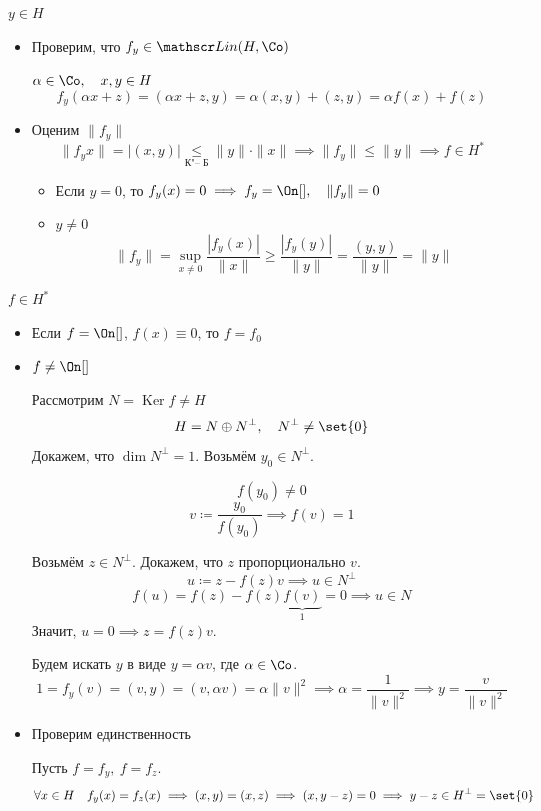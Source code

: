 \begin{eproof}
\item $ y \in H $
	\begin{itemize}
		\item Проверим, что $ f_y \in \mathscr Lin(H, \Co) $

			$ \alpha \in \Co, \quad x, y \in H $
			$$ f_y(\alpha x + z) = (\alpha x + z, y) =
			\alpha (x, y) + (z, y) = \alpha f(x) + f(z) $$
		\item Оценим $ \|f_y\| $
			$$ \|f_y x\| = |(x, y)| \underset{\text{К"--~Б}}\le \|y\| \cdot \|x\| \implies
			\|f_y\| \le \|y\| \implies f \in H^* $$

			\begin{itemize}
				\item Если $ y = 0 $, то $ f_y(x) = 0 \implies f_y = \On[], \quad \|f_y\| = 0 $
				\item $ y \ne 0 $
					$$ \|f_y\| = \sup\limits_{x \ne 0} \frac{|f_y(x)|}{\|x\|} \ge
					\frac{|f_y(y)|}{\|y\|} = \frac{(y, y)}{\|y\|} = \|y\| $$
			\end{itemize}
	\end{itemize}
\item $ f \in H^* $
	\begin{itemize}
		\item Если $ f = \On[] $, \ie $ f(x) \equiv 0 $, то $ f = f_0 $
		\item $ f \ne \On[] $

			Рассмотрим $ N = \operatorname{Ker} f \ne H $
			$$ H = N \oplus N^\perp, \quad N^\perp \ne \set{0} $$
			Докажем, что $ \dim N^\perp = 1 $.
			Возьмём $ y_0 \in N^\perp $.

			$$ f(y_0) \ne 0 $$
			$$ v \coloneq \frac{y_0}{f(y_0)} \implies f(v) = 1 $$

			Возьмём $ z \in N^\perp $.
			Докажем, что $ z $ пропорционально $ v $.
			$$ u \coloneq z - f(z)v \implies u \in N^\perp $$
			$$ f(u) = f(z) - f(z)\underbrace{f(v)}_1 = 0 \implies u \in N $$
			Значит, $ u = 0 \implies z = f(z)v $.

			Будем искать $ y $ в виде $ y = \alpha v $, где $ \alpha \in \Co $.
			$$ 1 = f_y(v) = (v, y) = (v, \alpha v) = \alpha \|v\|^2 \implies
			\alpha = \frac1{\|v\|^2} \implies y = \frac{v}{\|v\|^2} $$
		\item Проверим единственность

			Пусть $ f = f_y, ~ f = f_z $.
			$$ \forall x \in H \quad f_y(x) = f_z(x) \implies (x, y) = (x, z) \implies
			(x, y - z) = 0 \implies y - z \in H^\perp = \set{0} $$
	\end{itemize}
\end{eproof}

